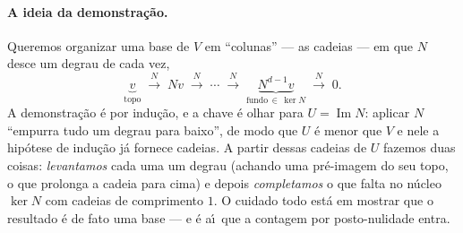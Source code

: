 \documentclass[11pt,a4paper]{amsart}
\newcommand{\img}{\operatorname{Im}}
\theoremstyle{plain}
\theoremstyle{definition}
\theoremstyle{remark}
\begin{document}
\paragraph{A ideia da demonstra\c{c}\~ao.}
Queremos organizar uma base de $V$ em ``colunas'' --- as cadeias --- em que
$N$ desce um degrau de cada vez,
\[
  \underbrace{v}_{\text{topo}} \;\xrightarrow{\,N\,}\; Nv
  \;\xrightarrow{\,N\,}\; \cdots
  \;\xrightarrow{\,N\,}\; \underbrace{N^{d-1}v}_{\text{fundo}\,\in\,\ker N}
  \;\xrightarrow{\,N\,}\; 0 .
\]
A demonstra\c{c}\~ao \'e por indu\c{c}\~ao, e a chave \'e olhar para
$U=\img N$: aplicar $N$ ``empurra tudo um degrau para baixo'', de modo que
$U$ \'e menor que $V$ e nele a hip\'otese de indu\c{c}\~ao j\'a fornece cadeias.
A partir dessas cadeias de $U$ fazemos duas coisas: \emph{levantamos} cada
uma um degrau (achando uma pr\'e-imagem do seu topo, o que prolonga a cadeia
para cima) e depois \emph{completamos} o que falta no n\'ucleo $\ker N$ com
cadeias de comprimento $1$. O cuidado todo est\'a em mostrar que o resultado
\'e de fato uma base --- e \'e a\'\i\ que a contagem por posto-nulidade entra.
\end{document}
